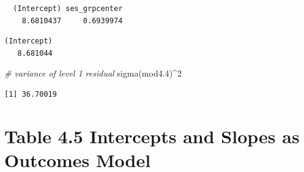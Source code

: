 \documentclass[
  letterpaper,
  DIV=11,
  numbers=noendperiod]{scrreprt}
\newenvironment{Shaded}{\begin{snugshade}}{\end{snugshade}}
\newcommand{\AlertTok}[1]{\textcolor[rgb]{1.00,0.00,0.00}{\textbf{#1}}}
\newcommand{\CommentTok}[1]{\textcolor[rgb]{0.38,0.63,0.69}{\textit{#1}}}
\newcommand{\DecValTok}[1]{\textcolor[rgb]{0.25,0.63,0.44}{#1}}
\newcommand{\FloatTok}[1]{\textcolor[rgb]{0.25,0.63,0.44}{#1}}
\newcommand{\FunctionTok}[1]{\textcolor[rgb]{0.02,0.16,0.49}{#1}}
\newcommand{\NormalTok}[1]{\textcolor[rgb]{0.00,0.44,0.13}{#1}}
\newcommand{\SpecialCharTok}[1]{\textcolor[rgb]{0.25,0.44,0.63}{#1}}
\begin{document}
\begin{verbatim}
  (Intercept) ses_grpcenter 
    8.6810437     0.6939974 
\end{verbatim}

\begin{Shaded}
\end{Shaded}

\begin{verbatim}
(Intercept) 
   8.681044 
\end{verbatim}

\begin{Shaded}
\begin{Highlighting}[]
\CommentTok{\# variance of level 1 residual}
\FunctionTok{sigma}\NormalTok{(mod4}\FloatTok{.4}\NormalTok{)}\SpecialCharTok{\^{}}\DecValTok{2}
\end{Highlighting}
\end{Shaded}

\begin{verbatim}
[1] 36.70019
\end{verbatim}

\hypertarget{table-4.5-intercepts-and-slopes-as-outcomes-model}{%
\section{Table 4.5 Intercepts and Slopes as Outcomes
Model}\label{table-4.5-intercepts-and-slopes-as-outcomes-model}}
\end{document}
